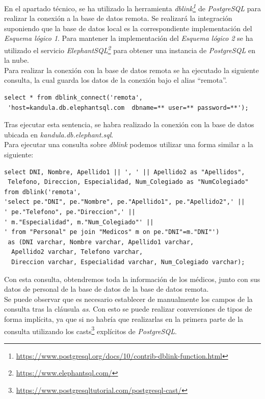 \documentclass{article}
\begin{document}
En el apartado técnico, se ha utilizado la herramienta \emph{dblink\footnote{\url{https://www.postgresql.org/docs/10/contrib-dblink-function.html}}} de \emph{PostgreSQL} para realizar la conexión a la base de datos remota. Se realizará la integración suponiendo que la base de datos local es la correspondiente implementación del \emph{Esquema lógico 1}. Para mantener la implementación del \emph{Esquema lógico 2} se ha utilizado el servicio \emph{ElephantSQL\footnote{\url{https://www.elephantsql.com/}}} para obtener una instancia de \emph{PostgreSQL} en la nube.\\
Para realizar la conexión con la base de datos remota se ha ejecutado la siguiente consulta, la cual guarda los datos de la conexión bajo el alias ``remota''.

\begin{lstlisting}
select * from dblink_connect('remota',
 'host=kandula.db.elephantsql.com  dbname=** user=** password=**');
\end{lstlisting}

Tras ejecutar esta sentencia, se habra realizado la conexión con la base de datos ubicada en \emph{kandula.db.elephant.sql}.\\
Para ejecutar una consulta sobre \emph{dblink} podemos utilizar una forma similar a la siguiente:

\begin{lstlisting}
select DNI, Nombre, Apellido1 || ', ' || Apellido2 as "Apellidos",
 Telefono, Direccion, Especialidad, Num_Colegiado as "NumColegiado"
from dblink('remota', 
'select pe."DNI", pe."Nombre", pe."Apellido1", pe."Apellido2",' || 
' pe."Telefono", pe."Direccion",' || 
' m."Especialidad", m."Num_Colegiado"' ||
' from "Personal" pe join "Medicos" m on pe."DNI"=m."DNI"') 
 as (DNI varchar, Nombre varchar, Apellido1 varchar,
  Apellido2 varchar, Telefono varchar,
  Direccion varchar, Especialidad varchar, Num_Colegiado varchar);
\end{lstlisting}

Con esta consulta, obtendremos toda la información de los médicos, junto con sus datos de personal de la base de datos de la base de datos remota.\\
Se puede observar que es necesario establecer de manualmente los campos de la consulta tras la cláusula \emph{as}. Con esto se puede realizar conversiones de tipos de forma implícita, ya que si no habría que realizarlas en la primera parte de la consulta utilizando los casts\footnote{\url{https://www.postgresqltutorial.com/postgresql-cast/}} explícitos de \emph{PostgreSQL}.\\
\end{document}
